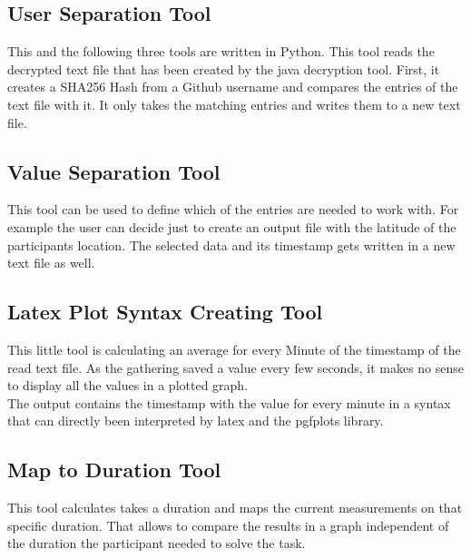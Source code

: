 \subsection{User Separation Tool}
This and the following three tools are written in Python. This tool reads the decrypted text file that has been created by the java decryption tool. First, it creates a SHA256 Hash from a Github username and compares the entries of the text file with it. It only takes the matching entries and writes them to a new text file. 

\subsection{Value Separation  Tool}
This tool can be used to define which of the entries are needed to work with. For example the user can decide just to create an output file with the latitude of the participants location. The selected data and its timestamp gets written in a new text file as well. 

\subsection{Latex Plot Syntax Creating Tool}
This little tool is calculating an average for every Minute of the timestamp of the read text file. As the gathering saved a value every few seconds, it makes no sense to display all the values in a plotted graph.\\
The output contains the timestamp with the value for every minute in a syntax that can directly been interpreted by latex and the pgfplots library. 

\subsection{Map to Duration Tool}
This tool calculates takes a duration and maps the current measurements on that specific duration. That allows to compare the results in a graph independent of the duration the participant needed to solve the task. 

